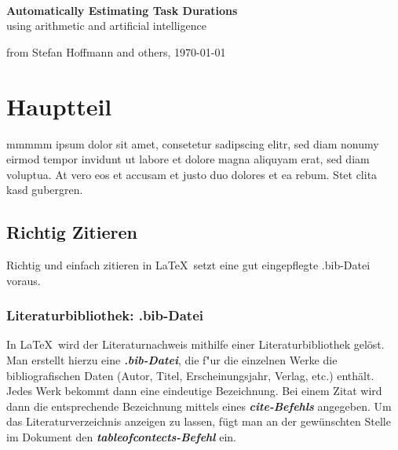 \documentclass[12pt,a4paper]{article}
\begin{document}
\thispagestyle{empty}
\vspace*{-3cm}
\begin{center}
\large \textsc{}
\vspace{0.5cm}
\vspace{5.5cm}
{\large}\\
\vspace{1cm}
{\Large \bf
Automatically Estimating Task Durations}\\
\vspace*{1cm}
{\large using arithmetic and artificial intelligence}
\end{center}
\vspace*{14cm}


\hspace*{\fill} from Stefan Hoffmann and others, \today

\newpage
{}
\tableofcontents



\newpage
{}




\newpage
\section{Hauptteil}\label{body}
mmmmm ipsum dolor sit amet, consetetur sadipscing elitr, sed diam nonumy eirmod tempor invidunt ut labore et dolore magna aliquyam erat, sed diam voluptua. At vero eos et accusam et justo duo dolores et ea rebum. Stet clita kasd gubergren.

\subsection{Richtig Zitieren}
Richtig und einfach zitieren in \LaTeX\ setzt eine gut eingepflegte  .bib-Datei voraus.
\subsubsection {Literaturbibliothek: .bib-Datei }
In \LaTeX\ wird der Literaturnachweis mithilfe einer Literaturbibliothek gelöst. Man erstellt hierzu eine \textbf{\emph{.bib-Datei}}, die f"ur die einzelnen Werke die bibliografischen Daten (Autor, Titel, Erscheinungsjahr, Verlag, etc.) enthält. Jedes Werk bekommt dann eine eindeutige Bezeichnung. Bei einem Zitat wird dann die entsprechende Bezeichnung mittels eines \textbf{\emph{cite-Befehls}} angegeben. Um das Literaturverzeichnis anzeigen zu lassen, fügt man an der gewünschten Stelle im Dokument den \textbf{\emph{tableofcontects-Befehl}} ein.
\end{document}
